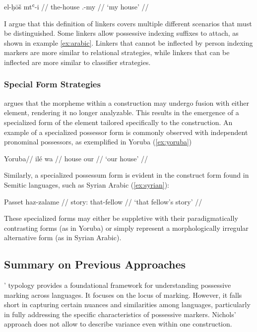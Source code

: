 \ex\label{ex:arabic}
\begingl
\gla el-ḥōš mtʿ-i //
\glb the-house \Poss.\Lnk{}-my //
\glft `my house' //
\endgl
\xe

I argue that this definition of linkers covers multiple different scenarios that must be distinguished. Some linkers allow possessive indexing suffixes to attach, as shown in example \ref{ex:arabic}. Linkers that cannot be inflected by person indexing markers are more similar to relational strategies, while linkers that can be inflected are more similar to classifier strategies.


\subsubsection{Special Form Strategies}
 
\cite{croft2002typology} argues that the morpheme within a construction may undergo fusion with either element, rendering it no longer analyzable. This results in the emergence of a specialized form of the element tailored specifically to the construction. An example of a specialized possessor form is commonly observed with independent pronominal possessors, as exemplified in Yoruba (\ref{ex:yoruba})

\ex
\label{ex:yoruba}
\begingl
\glpreamble Yoruba//
\gla ilé wa //
\glb house our //
\glft `our house' //
\endgl
\xe

Similarly, a specialized possessum form is evident in the construct form found in Semitic languages, such as Syrian Arabic (\ref{ex:syrian}):

\ex
\label{ex:syrian}
\begingl
\gla Passet haz-zalame //
\glb story:\Const{} that-fellow //
\glft `that fellow's story' //
\endgl
\xe

These specialized forms may either be suppletive with their paradigmatically contrasting forms (as in Yoruba) or simply represent a morphologically irregular alternative form (as in Syrian Arabic).


\subsection{Summary on Previous Approaches}

\citeauthor{nichols_locus_2013}' \citeyear{nichols_locus_2013} typology provides a foundational framework for understanding possessive marking across languages. It focuses on the locus of marking. However, it falls short in capturing certain nuances and similarities among languages, particularly in fully addressing the specific characteristics of possessive markers. Nichols' approach does not allow to describe variance even within one construction.

